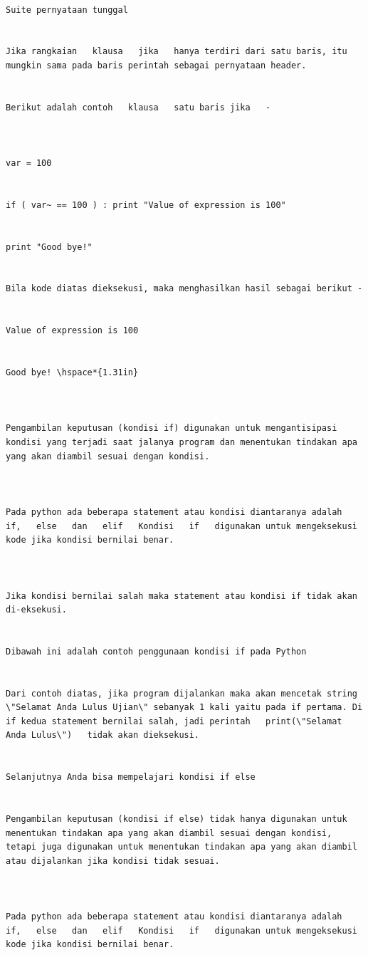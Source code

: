 \begin{verbatim}
 
Suite pernyataan tunggal 

 
Jika rangkaian   klausa   jika   hanya terdiri dari satu baris, itu mungkin sama pada baris perintah sebagai pernyataan header. 

 
Berikut adalah contoh   klausa   satu baris jika   - 


 
var = 100 

 
if ( var~ == 100 ) : print "Value of expression is 100" 

 
print "Good bye!" 

 
Bila kode diatas dieksekusi, maka menghasilkan hasil sebagai berikut - 

 
Value of expression is 100 

 
Good bye! \hspace*{1.31in}  
 

 
Pengambilan keputusan (kondisi if) digunakan untuk mengantisipasi kondisi yang terjadi saat jalanya program dan menentukan tindakan apa yang akan diambil sesuai dengan kondisi. 
 

 
Pada python ada beberapa statement atau kondisi diantaranya adalah   if,   else   dan   elif   Kondisi   if   digunakan untuk mengeksekusi kode jika kondisi bernilai benar. 
 

 
Jika kondisi bernilai salah maka statement atau kondisi if tidak akan di-eksekusi. 
 

Dibawah ini adalah contoh penggunaan kondisi if pada Python 
 

Dari contoh diatas, jika program dijalankan maka akan mencetak string \"Selamat Anda Lulus Ujian\" sebanyak 1 kali yaitu pada if pertama. Di if kedua statement bernilai salah, jadi perintah   print(\"Selamat Anda Lulus\")   tidak akan dieksekusi. 
 

Selanjutnya Anda bisa mempelajari kondisi if else 

 
Pengambilan keputusan (kondisi if else) tidak hanya digunakan untuk menentukan tindakan apa yang akan diambil sesuai dengan kondisi, tetapi juga digunakan untuk menentukan tindakan apa yang akan diambil atau dijalankan jika kondisi tidak sesuai.

 
 
Pada python ada beberapa statement atau kondisi diantaranya adalah   if,   else   dan   elif   Kondisi   if   digunakan untuk mengeksekusi kode jika kondisi bernilai benar.


\end{verbatim}
